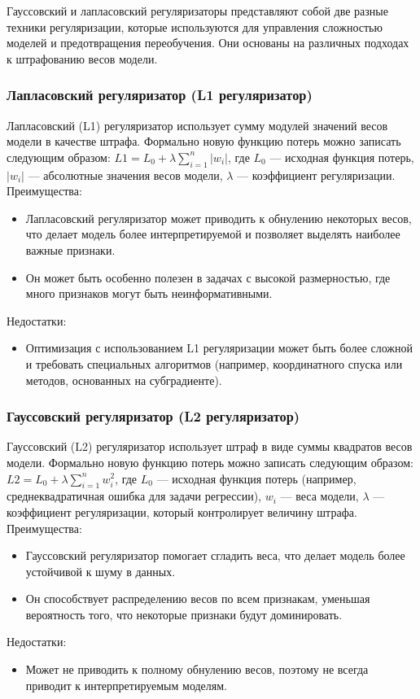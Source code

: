 Гауссовский и лапласовский регуляризаторы представляют собой две разные техники регуляризации, которые используются для управления сложностью моделей и предотвращения переобучения. Они основаны на различных подходах к штрафованию весов модели.

\subsubsection{Лапласовский регуляризатор (L1 регуляризатор)}

Лапласовский (L1) регуляризатор использует сумму модулей значений весов модели в качестве штрафа. Формально новую функцию потерь можно записать следующим образом:
$L1 = L_0 + \lambda \sum_{i=1}^{n} |w_i|$,
где $L_0$ --- исходная функция потерь, $|w_i|$ --- абсолютные значения весов модели, $\lambda$ --- коэффициент регуляризации.
\noindent
Преимущества:
\begin{itemize}
	\item Лапласовский регуляризатор может приводить к обнулению некоторых весов, что делает модель более интерпретируемой и позволяет выделять наиболее важные признаки.
	\item Он может быть особенно полезен в задачах с высокой размерностью, где много признаков могут быть неинформативными.
\end{itemize}
Недостатки:
\begin{itemize}
	\item Оптимизация с использованием L1 регуляризации может быть более сложной и требовать специальных алгоритмов (например, координатного спуска или методов, основанных на субградиенте).
\end{itemize}

\subsubsection{Гауссовский регуляризатор (L2 регуляризатор)}

Гауссовский (L2) регуляризатор использует штраф в виде суммы квадратов весов модели. Формально новую функцию потерь можно записать следующим образом:
$L2 = L_0 + \lambda \sum_{i=1}^{n} w_i^2$,
где $L_0$ — исходная функция потерь (например, среднеквадратичная ошибка для задачи регрессии), $w_i$ — веса модели, $\lambda$ — коэффициент регуляризации, который контролирует величину штрафа.
Преимущества:
\begin{itemize}
	\item Гауссовский регуляризатор помогает сгладить веса, что делает модель более устойчивой к шуму в данных.
	\item Он способствует распределению весов по всем признакам, уменьшая вероятность того, что некоторые признаки будут доминировать.
\end{itemize}
Недостатки:
\begin{itemize}
	\item Может не приводить к полному обнулению весов, поэтому не всегда приводит к интерпретируемым моделям.
\end{itemize}

